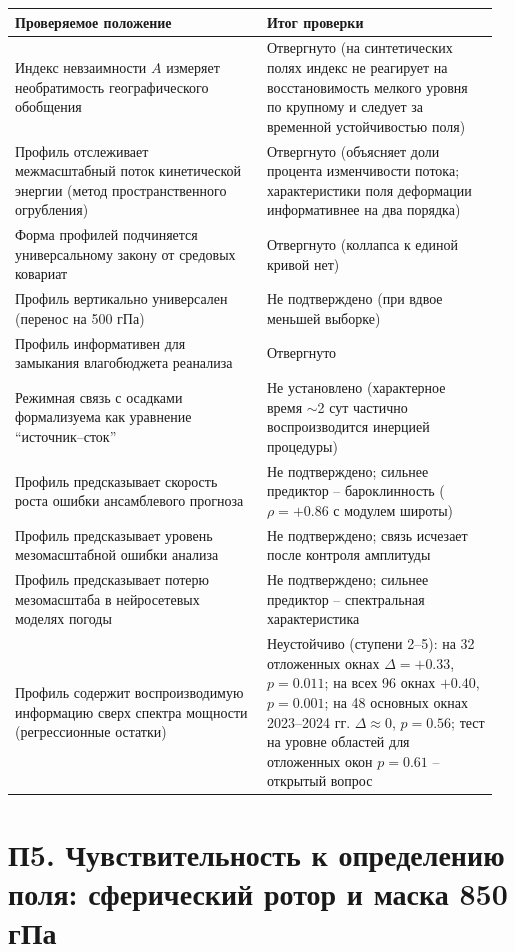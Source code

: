 \documentclass[12pt,a4paper]{article}
\begin{document}
\begin{singlespace}
\noindent\begin{tabular}{@{}p{0.5\linewidth}p{0.46\linewidth}@{}}
\toprule
Проверяемое положение & Итог проверки\\
\midrule
Индекс невзаимности $A$ измеряет необратимость географического обобщения & Отвергнуто (на синтетических полях индекс не реагирует на восстановимость мелкого уровня по крупному и следует за временной устойчивостью поля)\\
Профиль отслеживает межмасштабный поток кинетической энергии (метод пространственного огрубления) & Отвергнуто (объясняет доли процента изменчивости потока; характеристики поля деформации информативнее на два порядка)\\
Форма профилей подчиняется универсальному закону от средовых ковариат & Отвергнуто (коллапса к единой кривой нет)\\
Профиль вертикально универсален (перенос на 500 гПа) & Не подтверждено (при вдвое меньшей выборке)\\
Профиль информативен для замыкания влагобюджета реанализа & Отвергнуто\\
Режимная связь с осадками формализуема как уравнение “источник--сток” & Не установлено (характерное время $\sim$2 сут частично воспроизводится инерцией процедуры)\\
Профиль предсказывает скорость роста ошибки ансамблевого прогноза & Не подтверждено; сильнее предиктор -- бароклинность ($\rho = +0.86$ с модулем широты)\\
Профиль предсказывает уровень мезомасштабной ошибки анализа & Не подтверждено; связь исчезает после контроля амплитуды\\
Профиль предсказывает потерю мезомасштаба в нейросетевых моделях погоды & Не подтверждено; сильнее предиктор -- спектральная характеристика\\
Профиль содержит воспроизводимую информацию сверх спектра мощности (регрессионные остатки) & Неустойчиво (ступени 2--5): на 32 отложенных окнах $\Delta = +0.33$, $p = 0.011$; на всех 96 окнах $+0.40$, $p = 0.001$; на 48 основных окнах 2023--2024 гг. $\Delta \approx 0$, $p = 0.56$; тест на уровне областей для отложенных окон $p = 0.61$ -- открытый вопрос\\
\bottomrule
\end{tabular}
\end{singlespace}

\section*{П5. Чувствительность к определению поля: сферический ротор и маска 850 гПа}
\end{document}

